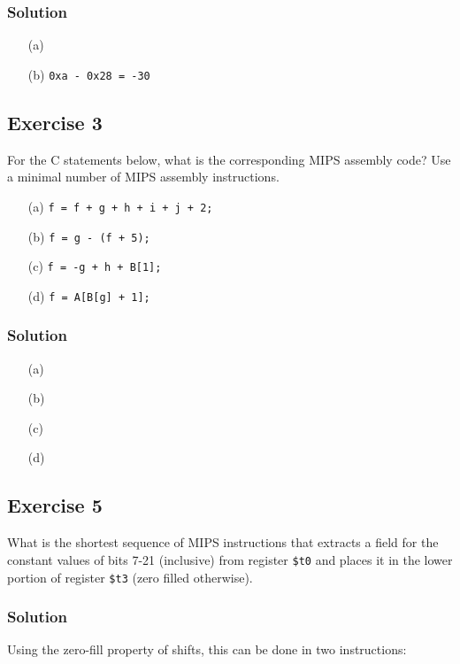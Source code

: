 \documentclass[12pt]{article}
\begin{document}
\subsubsection*{Solution}
\begin{itemize}
\item[(a)] 
\item[(b)] {\tt 0xa - 0x28 = -30}
\end{itemize}

\subsection*{Exercise 3}
For the C statements below, what is the corresponding MIPS assembly code? Use a minimal number of MIPS assembly instructions.
\begin{itemize}
\item[(a)] {\tt f = f + g + h + i + j + 2;}
\item[(b)] {\tt f = g - (f + 5);}
\item[(c)] {\tt f = -g + h + B[1];}
\item[(d)] {\tt f = A[B[g] + 1];}
\end{itemize}
\subsubsection*{Solution}
\begin{itemize}
\item[(a)] 

\item[(b)] 

\item[(c)] 

\item[(d)] 
\end{itemize}

\subsection*{Exercise 5}
What is the shortest sequence of MIPS instructions that extracts a field for the constant values of bits 7-21 (inclusive) from register {\tt\$t0} and places it in the lower portion of register {\tt\$t3} (zero filled otherwise).
\subsubsection*{Solution}
Using the zero-fill property of shifts, this can be done in two instructions:

\end{document}
